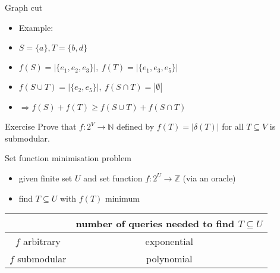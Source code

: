 \documentclass[usenames,dvipsnames]{beamer}
\newcommand{\N}{\mathbb{N}}
\newcommand{\Z}{\mathbb{Z}}
\begin{document}
  \begin{frame}{Graph cut}
    \begin{center}
    \end{center}
    \begin{itemize}
    \item[] Example: 
    \item $S = \{a\}, T = \{b,d\}$
    \item $f(S) = |\{e_1, e_2, e_3\}|,~f(T) = |\{e_1, e_3, e_5\}|$
    \item $f(S \cup T) = |\{e_2, e_5\}|,~f(S \cap T) = |\emptyset|$
    \item $\Rightarrow f(S) + f(T) \geq f(S \cup T) + f(S \cap T)$
    \end{itemize}
\end{frame}

  \begin{frame}{Exercise}
    Prove that $f: 2^V \rightarrow \N$ defined by $f(T) = |\delta(T)|$
    for all $T \subseteq V$ is submodular.
  \end{frame}

\begin{frame}{Set function minimisation problem}
  \begin{itemize}
    \item given finite set $U$ and set function $f: 2^U \rightarrow
      \Z$ (via an oracle)
    \item find $T \subseteq U$ with $f(T)$ minimum
  \end{itemize}
  \begin{tabular}{ c|c } 
    & number of queries needed to find $T \subseteq U$\\
    \hline
    $f$ arbitrary & exponential\\
    $f$ submodular & polynomial\\ 
  \end{tabular}
\end{frame}
\end{document}
